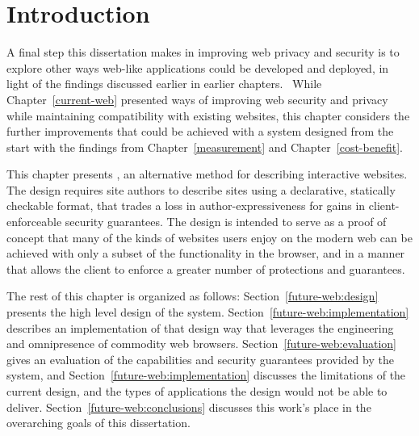 \section{Introduction}
\label{future-web:introduction}

A final step this dissertation makes in improving web privacy and security is
to explore other ways web-like applications could be developed and deployed, in
light of the findings discussed earlier in earlier chapters.  While
Chapter~\ref{current-web} presented ways of improving web security and privacy
while maintaining compatibility with existing websites, this chapter
considers the further improvements that could be achieved with a system
designed from the start with the findings from Chapter~\ref{measurement} and
Chapter~\ref{cost-benefit}.

This chapter presents \CDF, an alternative method for describing interactive
websites. The design requires site authors to describe sites using a
declarative, statically checkable format, that trades a loss in
author-expressiveness for gains in client-enforceable security guarantees.
The design is intended to serve as a proof of concept that many of the kinds
of websites users enjoy on the modern web can be achieved with only a subset of
the functionality in the browser, and in a manner that allows the client to
enforce a greater number of protections and guarantees.

The rest of this chapter is organized as follows:
Section~\ref{future-web:design} presents the high level design of the system.
Section~\ref{future-web:implementation} describes an implementation of that
design way that leverages the engineering and omnipresence of commodity
web browsers.  Section~\ref{future-web:evaluation} gives an evaluation of the
capabilities and security guarantees provided by the system, and
Section~\ref{future-web:implementation} discusses the limitations of the
current design, and the types of applications the design would not be able to
deliver.  Section~\ref{future-web:conclusions} discusses this work's place in
the overarching goals of this dissertation.
